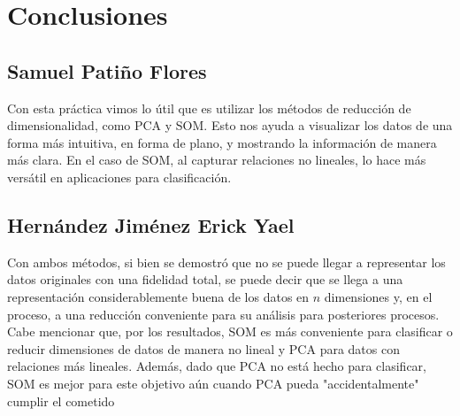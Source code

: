 \section[Conclusiones]{Conclusiones}

\subsection[SPF]{Samuel Patiño Flores}
Con esta práctica vimos lo útil que es utilizar los métodos de reducción de dimensionalidad, como PCA y SOM. Esto nos ayuda a visualizar los datos de una forma más intuitiva, en forma de plano, y mostrando la información de manera más clara. En el caso de SOM, al capturar relaciones no lineales, lo hace más versátil en aplicaciones para clasificación.

\subsection[HJEY]{Hernández Jiménez Erick Yael}
Con ambos métodos, si bien se demostró que no se puede llegar a representar los datos originales con una fidelidad total, se puede decir que se llega a una representación considerablemente buena de los datos en $n$ dimensiones y, en el proceso, a una reducción conveniente para su análisis para posteriores procesos.  Cabe mencionar que, por los resultados, SOM es más conveniente para clasificar o reducir dimensiones de datos de manera no lineal y PCA para datos con relaciones más lineales. Además, dado que PCA no está hecho para clasificar, SOM es mejor para este objetivo aún cuando PCA pueda "accidentalmente" cumplir el cometido